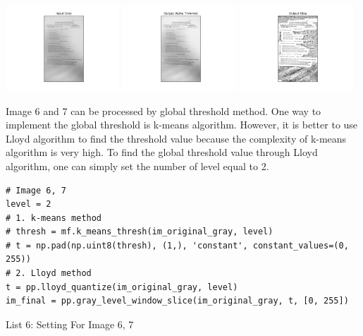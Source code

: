 \documentclass[titlepage]{article}
\begin{document}
\begin{center}
\includegraphics[width=0.32\textwidth]{img_5_gray.png}
\includegraphics[width=0.32\textwidth]{img_5_output_alpha_trimmed.png}
\includegraphics[width=0.32\textwidth]{img_5_output_otsu.png}
\end{center}

Image 6 and 7 can be processed by global threshold method. One way to
implement the global threshold is k-means algorithm. However, it is better to
use Lloyd algorithm to find the threshold value because the complexity of
k-means algorithm is very high. To find the global threshold value through
Lloyd algorithm, one can simply set the number of level equal to 2.

\begin{listing}
\begin{verbatim}
# Image 6, 7 
level = 2
# 1. k-means method
# thresh = mf.k_means_thresh(im_original_gray, level)
# t = np.pad(np.uint8(thresh), (1,), 'constant', constant_values=(0, 255))
# 2. Lloyd method
t = pp.lloyd_quantize(im_original_gray, level)
im_final = pp.gray_level_window_slice(im_original_gray, t, [0, 255])
\end{verbatim}
\centering
\caption{List 6: Setting For Image 6, 7}
\newline
\end{listing}
\end{document}
